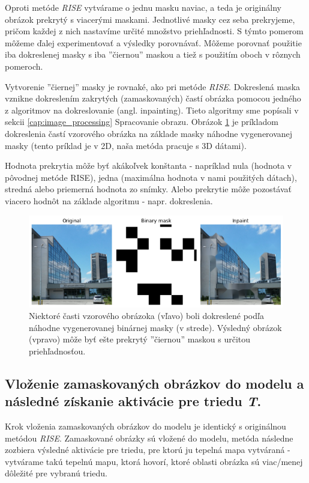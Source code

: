 Oproti metóde \textit{RISE} vytvárame o jednu masku naviac, a teda je originálny obrázok prekrytý s viacerými maskami. Jednotlivé masky cez seba prekryjeme, pričom každej z nich nastavíme určité množstvo priehľadnosti. S týmto pomerom môžeme ďalej experimentovať a výsledky porovnávať. Môžeme porovnať použitie iba dokreslenej masky s iba ''čiernou'' maskou a tiež s použitím oboch v rôznych pomeroch.

Vytvorenie ''čiernej'' masky je rovnaké, ako pri metóde \textit{RISE}. Dokreslená maska vznikne dokreslením zakrytých (zamaskovaných) častí obrázka pomocou jedného z algoritmov na dokreslovanie (angl. inpainting). Tieto algoritmy sme popísali v sekcii \ref{cap:image_processing} Spracovanie obrazu. Obrázok \ref{fig:risei_inpainting_example} je príkladom dokreslenia častí vzorového obrázka na základe masky náhodne vygenerovanej masky (tento príklad je v 2D, naša metóda pracuje s 3D dátami).

Hodnota prekrytia môže byť akákoľvek konštanta - napríklad nula (hodnota v pôvodnej metóde RISE), jedna (maximálna hodnota v nami použitých dátach), stredná alebo priemerná hodnota zo snímky. Alebo prekrytie môže pozostávať viacero hodnôt na základe algoritmu - napr. dokreslenia.

\begin{figure}[h!]
    \centering
    \includegraphics[width=13cm]{assets/images/risei_inpainting_example.png}
    \caption{Niektoré časti vzorového obrázoka (vľavo) boli dokreslené podľa náhodne vygenerovanej binárnej masky (v strede). Výsledný obrázok (vpravo) môže byť ešte prekrytý ''čiernou'' maskou s určitou priehľadnosťou.}
    \label{fig:risei_inpainting_example}
\end{figure}

\subsection{Vloženie zamaskovaných obrázkov do modelu a následné získanie aktivácie pre triedu \textit{T}.}

Krok vloženia zamaskovaných obrázkov do modelu je identický s originálnou metódou \textit{RISE}. Zamaskované obrázky sú vložené do modelu, metóda následne zozbiera výsledné aktivácie pre triedu, pre ktorú ju tepelná mapa vytváraná - vytvárame takú tepelnú mapu, ktorá hovorí, ktoré oblasti obrázka sú viac/menej dôležité pre vybranú triedu.

